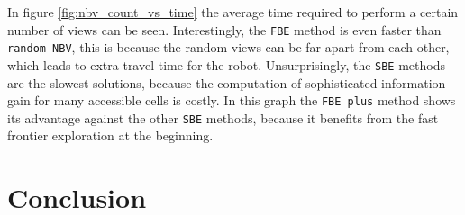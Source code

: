 \documentclass[a4paper,11pt,english]{article}
\begin{document}
In figure \ref{fig:nbv_count_vs_time} the average time required to perform a certain number of views can be seen. 
Interestingly, the \texttt{FBE} method is even faster than \texttt{random NBV}, this is because the random views can be far apart from each other, which leads to extra travel time for the robot.
Unsurprisingly, the \texttt{SBE} methods are the slowest solutions, because the computation of sophisticated information gain for many accessible cells is costly. In this graph the \texttt{FBE plus} method shows its advantage against the other \texttt{SBE} methods, because it benefits from the fast frontier exploration at the beginning.

\section{Conclusion}
\label{Conclusion}



\newpage


\end{document}
